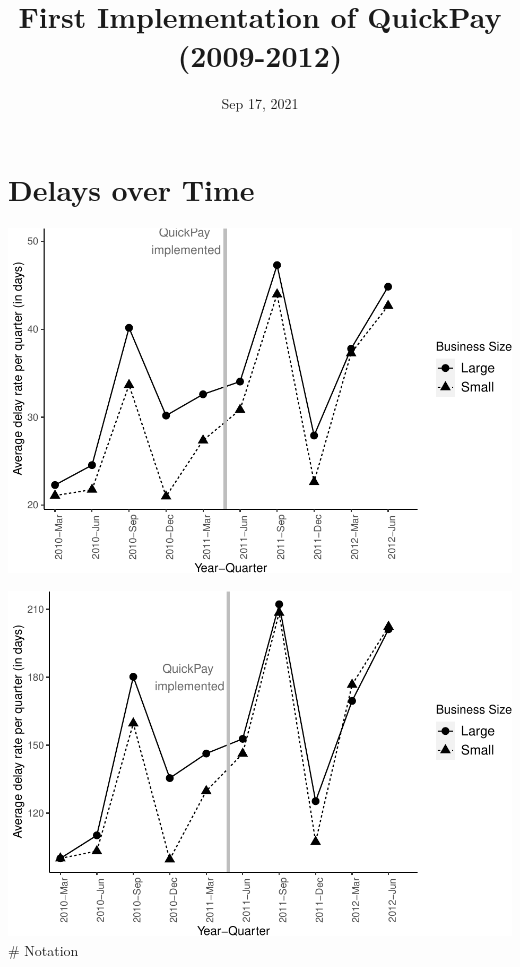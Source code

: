 \documentclass[
]{article}
\title{First Implementation of QuickPay (2009-2012)}
\author{}
\date{\vspace{-2.5em}Sep 17, 2021}
\begin{document}
\maketitle

\hypertarget{delays-over-time}{%
\section{Delays over Time}\label{delays-over-time}}

\includegraphics{qp_first_implementation_files/figure-latex/plot-1.pdf}

\includegraphics{qp_first_implementation_files/figure-latex/normalized_plot-1.pdf}
\# Notation
\end{document}
